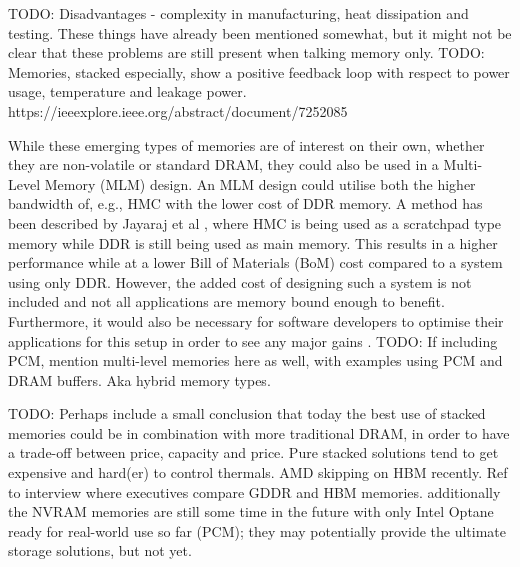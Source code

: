 TODO: Disadvantages - complexity in manufacturing, heat dissipation and testing. These things have already been mentioned somewhat, but it might not be clear that these problems are still present when talking memory only. 
TODO: Memories, stacked especially, show a positive feedback loop with respect to power usage, temperature and leakage power. https://ieeexplore.ieee.org/abstract/document/7252085 \cite{4212027}

While these emerging types of memories are of interest on their own, whether they are non-volatile or standard DRAM, they could also be used in a Multi-Level Memory (MLM) design. An MLM design could utilise both the higher bandwidth of, e.g., HMC with the lower cost of DDR memory. A method has been described by Jayaraj et al \cite{Jayaraj:2015:PPM:2818950.2818976}, where HMC is being used as a scratchpad type memory while DDR is still being used as main memory. This results in a higher performance while at a lower Bill of Materials (BoM) cost compared to a system using only DDR. However, the added cost of designing such a system is not included and not all applications are memory bound enough to benefit. Furthermore, it would also be necessary for software developers to optimise their applications for this setup in order to see any major gains \cite{Bender:2015:KCT:2818950.2818977}\cite{BENDER2017213}. TODO: If including PCM, mention multi-level memories here as well, with examples using PCM and DRAM buffers. Aka hybrid memory types.
\bigskip

TODO: Perhaps include a small conclusion that today the best use of stacked memories could be in combination with more traditional DRAM, in order to have a trade-off between price, capacity and price. Pure stacked solutions tend to get expensive and hard(er) to control thermals. AMD skipping on HBM recently. Ref to interview where executives compare GDDR and HBM memories. additionally the NVRAM memories are still some time in the future with only Intel Optane ready for real-world use so far (PCM); they may potentially provide the ultimate storage solutions, but not yet. 

